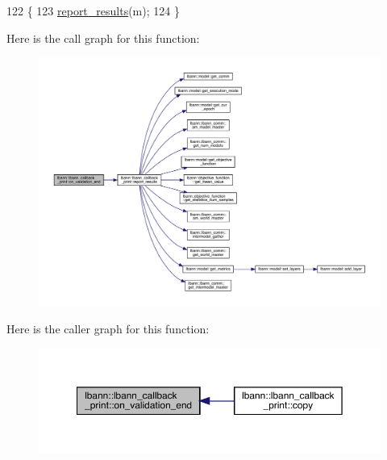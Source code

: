 \begin{DoxyCode}
122                                                      \{
123   \hyperlink{classlbann_1_1lbann__callback__print_a50117faa3edb961ddd87c5c5806820b2}{report\_results}(m);
124 \}
\end{DoxyCode}
Here is the call graph for this function\+:\nopagebreak
\begin{figure}[H]
\begin{center}
\leavevmode
\includegraphics[width=350pt]{classlbann_1_1lbann__callback__print_a7090572e2f89e7994872b5fdb612dd3f_cgraph}
\end{center}
\end{figure}
Here is the caller graph for this function\+:\nopagebreak
\begin{figure}[H]
\begin{center}
\leavevmode
\includegraphics[width=350pt]{classlbann_1_1lbann__callback__print_a7090572e2f89e7994872b5fdb612dd3f_icgraph}
\end{center}
\end{figure}
\mbox{\label{classlbann_1_1lbann__callback__print_a4924cd2aebecdca00dbc0ac9d71df666}} 
